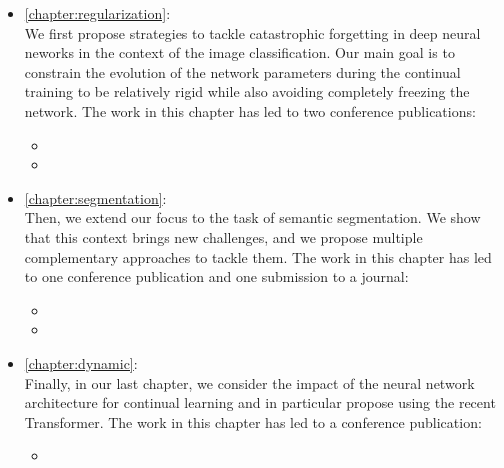 \begin{itemize}
      \item \autoref{chapter:regularization}: \\
            We first propose strategies to tackle catastrophic forgetting in deep neural neworks in
            the context of the image classification. Our main goal is to constrain the evolution of the
            network parameters during the continual training to be relatively rigid while also
            avoiding completely freezing the network. The work in this chapter has led to two
            conference publications:
            \begin{itemize}
                  \item {}
                  \item {}
            \end{itemize}

      \item \autoref{chapter:segmentation}: \\
            Then, we extend our focus to the task of semantic segmentation. We show that this
            context brings new challenges, and we propose multiple complementary approaches to tackle
            them. The work in this chapter has led to one conference publication and one submission
            to a journal:
            \begin{itemize}
                  \item {}
                  \item {}
            \end{itemize}

      \item \autoref{chapter:dynamic}: \\
            Finally, in our last chapter, we consider the impact of the neural network architecture
            for continual learning and in particular propose using the recent Transformer. The work
            in this chapter has led to a conference publication:
            \begin{itemize}
                  \item {}
            \end{itemize}
\end{itemize}


